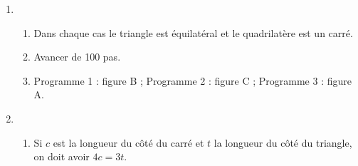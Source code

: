 \begin{enumerate}
\item %


	\begin{enumerate}
		\item %
Dans chaque cas le triangle est équilatéral et le quadrilatère est un carré.
		\item %
Avancer de 100 pas.
		\item %
Programme 1 : figure B ; Programme 2 : figure C ; Programme 3 : figure A.
	\end{enumerate}
\item  
	\begin{enumerate}
		\item %
Si $c$ est la longueur du côté du carré et $t$ la longueur du côté du triangle, on doit avoir $4c = 3t$.
		

\end{enumerate}
\end{enumerate}
